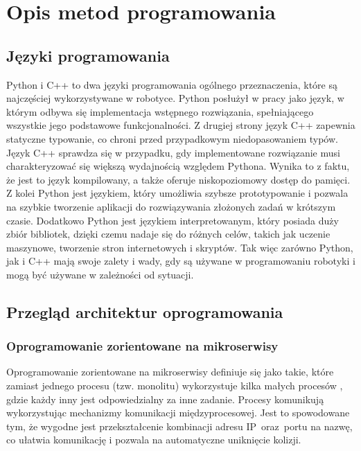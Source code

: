 \newpage
\section{Opis metod programowania}
{

    \subsection{Języki programowania}
    {
        Python i C++ to dwa języki programowania ogólnego przeznaczenia, które są najczęściej wykorzystywane w robotyce. Python posłużył w pracy jako język, w którym odbywa się implementacja wstępnego rozwiązania, spełniającego wszystkie jego podstawowe funkcjonalności. Z drugiej strony język C++ zapewnia statyczne typowanie, co chroni przed przypadkowym niedopasowaniem typów. Język C++ sprawdza się w przypadku, gdy implementowane rozwiązanie musi charakteryzować się większą wydajnością względem Pythona. Wynika to z faktu, że jest to język kompilowany, a także oferuje niskopoziomowy dostęp do pamięci. Z kolei Python jest językiem, który umożliwia szybsze prototypowanie i pozwala na szybkie tworzenie aplikacji do rozwiązywania złożonych zadań w krótszym czasie. Dodatkowo Python jest językiem interpretowanym, który posiada duży zbiór bibliotek, dzięki czemu nadaje się do różnych celów, takich jak uczenie maszynowe, tworzenie stron internetowych i skryptów. Tak więc zarówno Python, jak i C++ mają swoje zalety i wady, gdy są używane w programowaniu robotyki i mogą być używane w zależności od sytuacji.
    }

    \subsection{Przegląd architektur oprogramowania}
    {
        
        \subsubsection{Oprogramowanie zorientowane na mikroserwisy}
        {
        Oprogramowanie zorientowane na mikroserwisy definiuje się jako takie, które zamiast jednego procesu (tzw. monolitu) wykorzystuje kilka małych procesów \cite{microservices}, gdzie każdy inny jest odpowiedzialny za inne zadanie. Procesy komunikują wykorzystując mechanizmy komunikacji międzyprocesowej. Jest to spowodowane tym, że wygodne jest przekształcenie kombinacji adresu IP~oraz~portu na nazwę, co ułatwia komunikację i pozwala na automatyczne uniknięcie kolizji. 
        
}}}
